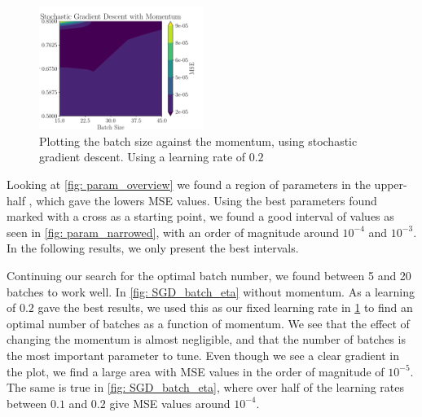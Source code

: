 \begin{figure}[ht!]
    \centering
    \includegraphics[width = 0.47575\textwidth]{../figs/SGD_batch_gamma.pdf}
    \caption{Plotting the batch size against the momentum, using stochastic gradient descent. Using a learning rate of $0.2$}
    \label{fig: SGD_batch_gamma}
\end{figure}

Looking at \cref{fig: param_overview} we found a region of parameters  in the upper-half , which gave the lowers MSE values. Using the best parameters found marked with a cross as a starting point, we found a good interval of values as seen in \cref{fig: param_narrowed}, with an order of magnitude around $10^{-4}$ and $10^{-3}$. In the following results, we only present the best intervals.

Continuing our search for the optimal batch number, we found between 5 and 20 batches to work well. In \cref{fig: SGD_batch_eta} without momentum. As a learning of $0.2$ gave the best results, we used this as our fixed learning rate in \cref{fig: SGD_batch_gamma} to find an optimal number of batches as a function of momentum. We see that the effect of changing the momentum is almost negligible, and that the number of batches is the most important parameter to tune. Even though we see a clear gradient in the plot, we find a large area with MSE values in the order of magnitude of \(10^{-5}\). The same is true in \cref{fig: SGD_batch_eta}, where over half of the learning rates between $0.1$ and $0.2$ give MSE values around \(10^{-4}\).

